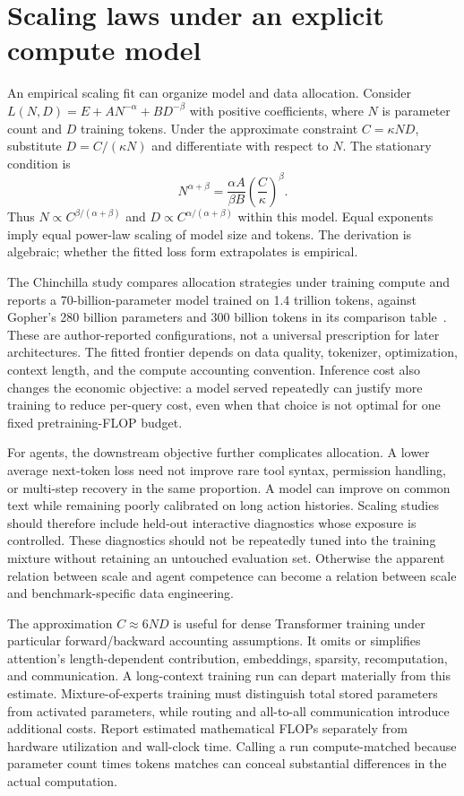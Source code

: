 \section{Scaling laws under an explicit compute model}
\label{sec:C07:scaling}
An empirical scaling fit can organize model and data allocation. Consider $L(N,D)=E+A N^{-\alpha}+B D^{-\beta}$ with positive coefficients, where $N$ is parameter count and $D$ training tokens. Under the approximate constraint $C=\kappa ND$, substitute $D=C/(\kappa N)$ and differentiate with respect to $N$. The stationary condition is
\begin{equation}
 N^{\alpha+\beta}=\frac{\alpha A}{\beta B}
 \left(\frac C\kappa\right)^\beta.
\end{equation}
Thus $N\propto C^{\beta/(\alpha+\beta)}$ and $D\propto C^{\alpha/(\alpha+\beta)}$ within this model. Equal exponents imply equal power-law scaling of model size and tokens. The derivation is algebraic; whether the fitted loss form extrapolates is empirical.

The Chinchilla study compares allocation strategies under training compute and reports a 70-billion-parameter model trained on 1.4 trillion tokens, against Gopher's 280 billion parameters and 300 billion tokens in its comparison table~\cite{hoffmann2022chinchilla}. These are author-reported configurations, not a universal prescription for later architectures. The fitted frontier depends on data quality, tokenizer, optimization, context length, and the compute accounting convention. Inference cost also changes the economic objective: a model served repeatedly can justify more training to reduce per-query cost, even when that choice is not optimal for one fixed pretraining-FLOP budget.

For agents, the downstream objective further complicates allocation. A lower average next-token loss need not improve rare tool syntax, permission handling, or multi-step recovery in the same proportion. A model can improve on common text while remaining poorly calibrated on long action histories. Scaling studies should therefore include held-out interactive diagnostics whose exposure is controlled. These diagnostics should not be repeatedly tuned into the training mixture without retaining an untouched evaluation set. Otherwise the apparent relation between scale and agent competence can become a relation between scale and benchmark-specific data engineering.

The approximation $C\approx6ND$ is useful for dense Transformer training under particular forward/backward accounting assumptions. It omits or simplifies attention's length-dependent contribution, embeddings, sparsity, recomputation, and communication. A long-context training run can depart materially from this estimate. Mixture-of-experts training must distinguish total stored parameters from activated parameters, while routing and all-to-all communication introduce additional costs. Report estimated mathematical FLOPs separately from hardware utilization and wall-clock time. Calling a run compute-matched because parameter count times tokens matches can conceal substantial differences in the actual computation.

